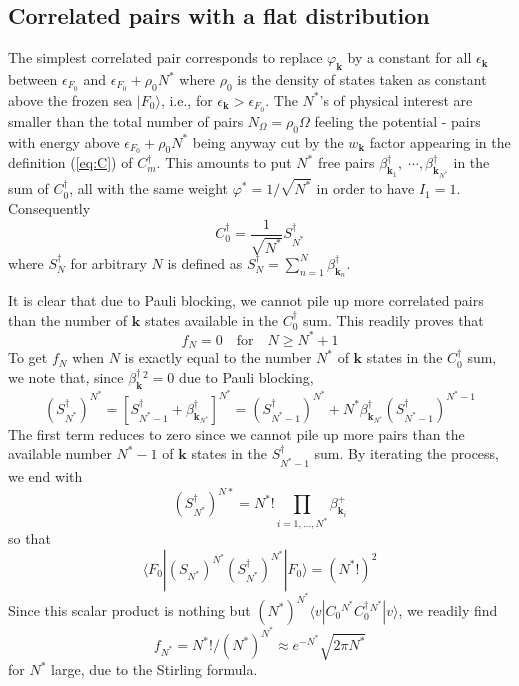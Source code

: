 \documentclass[aps,prb,preprint,groupedaddress,amsmath]{revtex4-1}
\newcommand{\vk}{\ensuremath{\mathbf{k}}}
\newcommand{\dg}{\ensuremath{\dagger}}
\begin{document}
\subsection{Correlated pairs with a flat distribution}
The simplest correlated pair corresponds to replace $\varphi_\vk$ by a constant for all $\epsilon_\vk$ between $\epsilon_{F_0}$ and $\epsilon_{F_0}+\rho_0N^*$ where $\rho_0$ is the density of states taken as constant above the frozen sea $|F_0\rangle$, i.e., for $\epsilon_\vk>\epsilon_{F_0}$. The $N^*$'s of physical interest are smaller than the total number of pairs $N_\Omega=\rho_0\Omega$ feeling the potential - pairs with energy above $\epsilon_{F_0}+\rho_0N^*$ being anyway cut by the $w_\vk$ factor appearing in the definition (\ref{eq:C}) of $C_m^\dg$.  This amounts to put $N^*$ free pairs $\beta_{\vk_1}^\dg,\;\cdots,\beta_{\vk_{N^*}}^\dg$ in the sum of $C_0^\dg$, all with the same weight $\varphi^*=1/\sqrt{N^*}$ in order to have $I_1=1$.  Consequently
\begin{equation}
C^\dg_0=\frac1{\sqrt{N^*}}S^\dg_{N^*}
\end{equation}
 where  $S_N^\dg$ for arbitrary $N$ is defined as $S_N^\dg=\sum_{n=1}^N\beta^\dg_{\vk_n}$. 

It is clear that due to Pauli blocking, we cannot pile up more correlated pairs than the number of $\vk$ states available in the $C^\dg_0$ sum.  This readily proves that
\begin{equation}
f_N=0\quad \mbox{for}\quad N\geq{}N^*+1
\end{equation}
To get $f_N$ when $N$ is exactly equal to the number $N^*$ of $\vk$ states in the $C^\dg_0$ sum, we note that, since $\beta^\dg_\vk{}^2=0$ due to Pauli blocking,
\begin{equation}
(S_{N^*}^\dg)^{N^*}=[S^\dg_{N^*-1}+\beta^\dg_{\vk_{N^*}}]^{N^*}=(S_{N^*-1}^\dg)^{N^*}+N^*\beta^\dg_{\vk_{N^*}}(S_{N^*-1}^\dg)^{N^*-1}
\end{equation}
The first term reduces to zero since we cannot pile up more pairs than the available number $N^*-1$ of $\vk$ states in the $S^\dg_{N^*-1}$ sum. By iterating the process, we end with 
\begin{equation}
(S^\dg_{N^*})^{N*}=N^*!\prod_{i=1,\dots,N^*}\beta_{\vk_i}^+
\end{equation}
 so that 
\begin{equation}\label{eq:FnSn}
\langle{F_0}|(S_{N^*}^{})^{N^*}(S_{N^*}^\dg)^{N^*}|F_0\rangle=(N^*!)^2
\end{equation}
Since this scalar product is nothing but $(N^*)^{N^*}\langle{}v|C_0{}^{N^*}C_0^\dg{}^{N^*}|v\rangle$, we readily find \begin{equation}
f_{N^*}=N^*!/(N^*)^{N^*}\approx{}e^{-N^*}\sqrt{2\pi{N^*}}
\end{equation}
 for $N^*$ large, due to the Stirling formula. 
 
\end{document}
